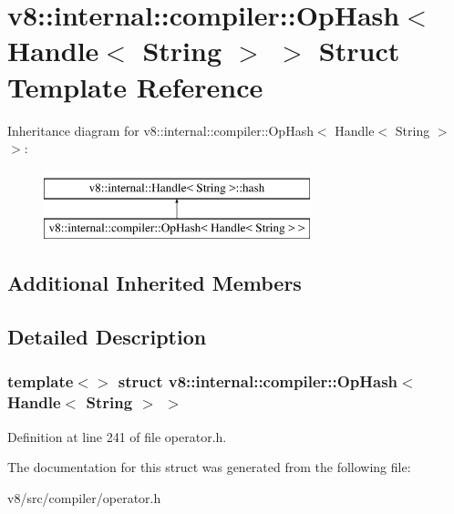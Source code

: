 \hypertarget{structv8_1_1internal_1_1compiler_1_1OpHash_3_01Handle_3_01String_01_4_01_4}{}\section{v8\+:\+:internal\+:\+:compiler\+:\+:Op\+Hash$<$ Handle$<$ String $>$ $>$ Struct Template Reference}
\label{structv8_1_1internal_1_1compiler_1_1OpHash_3_01Handle_3_01String_01_4_01_4}
Inheritance diagram for v8\+:\+:internal\+:\+:compiler\+:\+:Op\+Hash$<$ Handle$<$ String $>$ $>$\+:\begin{figure}[H]
\begin{center}
\leavevmode
\includegraphics[height=2.000000cm]{structv8_1_1internal_1_1compiler_1_1OpHash_3_01Handle_3_01String_01_4_01_4}
\end{center}
\end{figure}
\subsection*{Additional Inherited Members}


\subsection{Detailed Description}
\subsubsection*{template$<$$>$\newline
struct v8\+::internal\+::compiler\+::\+Op\+Hash$<$ Handle$<$ String $>$ $>$}



Definition at line 241 of file operator.\+h.



The documentation for this struct was generated from the following file\+:\begin{DoxyCompactItemize}
\item 
v8/src/compiler/operator.\+h\end{DoxyCompactItemize}
